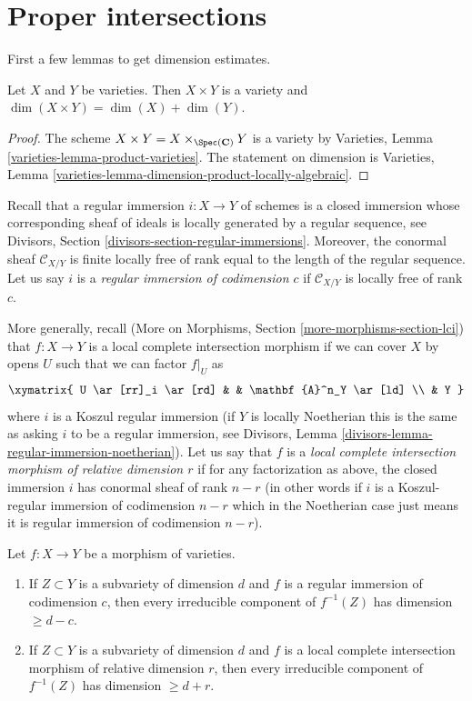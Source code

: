 \section{Proper intersections}
\label{section-intersect-properly}

\noindent
First a few lemmas to get dimension estimates.

\begin{lemma}
\label{lemma-dimension-product-varieties}
Let $X$ and $Y$ be varieties. Then $X \times Y$ is a variety and
$\dim(X \times Y) = \dim(X) + \dim(Y)$.
\end{lemma}

\begin{proof}
The scheme $X \times Y = X \times_{\Spec(\mathbf{C})} Y$ is a variety by
Varieties, Lemma \ref{varieties-lemma-product-varieties}.
The statement on dimension is
Varieties, Lemma \ref{varieties-lemma-dimension-product-locally-algebraic}.
\end{proof}

\noindent
Recall that a regular immersion $i : X \to Y$ of schemes
is a closed immersion whose
corresponding sheaf of ideals is locally generated by a regular sequence, see
Divisors, Section \ref{divisors-section-regular-immersions}.
Moreover, the conormal sheaf $\mathcal{C}_{X/Y}$ is finite locally free of
rank equal to the length of the regular sequence. Let us say $i$ is a
{\it regular immersion of codimension $c$}
if $\mathcal{C}_{X/Y}$ is locally free of rank $c$.

\medskip\noindent
More generally, recall
(More on Morphisms, Section \ref{more-morphisms-section-lci})
that $f : X \to Y$ is a local complete intersection
morphism if we can cover $X$ by opens $U$ such that we can factor
$f|_U$ as
$$
\xymatrix{
U \ar[rr]_i \ar[rd] & & \mathbf{A}^n_Y \ar[ld] \\
& Y
}
$$
where $i$ is a Koszul regular immersion (if $Y$ is locally Noetherian
this is the same as asking $i$ to be a regular immersion, see
Divisors, Lemma \ref{divisors-lemma-regular-immersion-noetherian}).
Let us say that $f$ is a {\it local complete intersection morphism
of relative dimension $r$} if for any factorization as above, the
closed immersion $i$ has conormal sheaf of rank $n - r$ (in other
words if $i$ is a Koszul-regular immersion of codimension $n - r$
which in the Noetherian case just means it is regular immersion of
codimension $n - r$).

\begin{lemma}
\label{lemma-pullback-by-regular-immersion}
Let $f : X \to Y$ be a morphism of varieties.
\begin{enumerate}
\item If $Z \subset Y$ is a subvariety of dimension $d$ and $f$ is a regular
immersion of codimension $c$, then every irreducible component
of $f^{-1}(Z)$ has dimension $\geq d - c$.
\item If $Z \subset Y$ is a subvariety of dimension $d$ and
$f$ is a local complete intersection morphism of relative dimension $r$,
then every irreducible component of $f^{-1}(Z)$ has dimension $\geq d + r$.
\end{enumerate}
\end{lemma}

